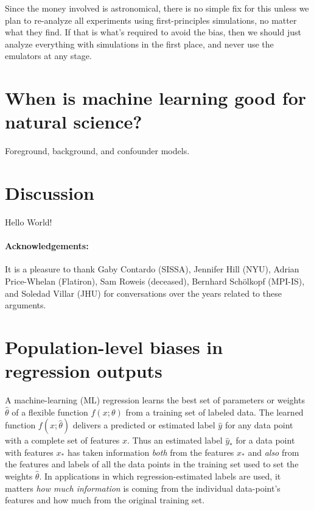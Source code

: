 \documentclass[11pt]{article}
\begin{document}
Since the money involved is astronomical, there is no simple fix for this unless we plan to re-analyze all experiments using first-principles simulations, no matter what they find.
If that is what's required to avoid the bias, then we should just analyze everything with simulations in the first place, and never use the emulators at any stage.

\section{When is machine learning good for natural science?}\label{sec:good}

Foreground, background, and confounder models.

\section{Discussion}\label{sec:discussion}

Hello World!

\paragraph{Acknowledgements:}
It is a pleasure to thank
  Gaby Contardo (SISSA),
  Jennifer Hill (NYU),
  Adrian Price-Whelan (Flatiron),
  Sam Roweis (deceased),
  Bernhard Sch\"olkopf (MPI-IS), and
  Soledad Villar (JHU)
for conversations over the years related to these arguments.

{\raggedright


}

\clearpage\appendix
\section{Population-level biases in regression outputs}
A machine-learning (ML) regression learns the best set of parameters or weights $\hat{\theta}$ of a flexible function $f(x;\theta)$ from a training set of labeled data.
The learned function $f(x;\hat{\theta})$ delivers a predicted or estimated label $\hat{y}$ for any data point with a complete set of features $x$.
Thus an estimated label $\hat{y}_\ast$ for a data point with features $x_\ast$ has taken information \emph{both} from the features $x_\ast$ and \emph{also} from the features and labels of all the data points in the training set used to set the weights $\hat{\theta}$.
In applications in which regression-estimated labels are used, it matters \emph{how much information} is coming from the individual data-point's features and how much from the original training set.
\end{document}
